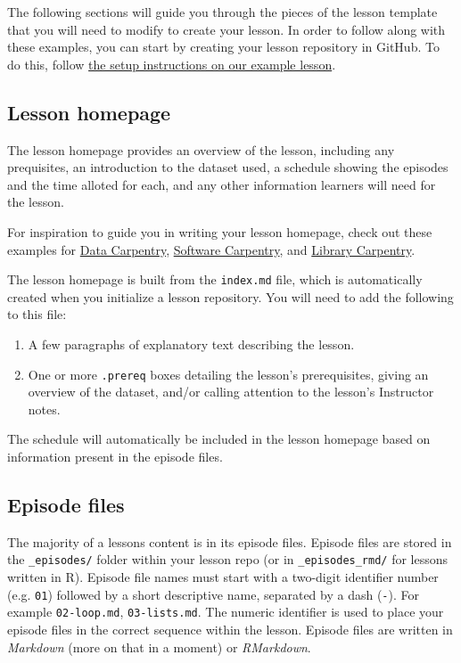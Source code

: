 \documentclass[]{book}
\providecommand{\tightlist}{%
  \setlength{\itemsep}{0pt}\setlength{\parskip}{0pt}}
\begin{document}
The following sections will guide you through the pieces of
the lesson template that you will need to modify to create your lesson.
In order to follow along with these examples, you can start by creating your
lesson repository in GitHub. To do this, follow \href{http://carpentries.github.io/lesson-example/setup.html}{the setup instructions
on our example lesson}.

\hypertarget{lesson-homepage}{%
\subsection{Lesson homepage}\label{lesson-homepage}}

The lesson homepage provides an overview of the lesson, including
any prequisites, an introduction to the
dataset used, a schedule showing
the episodes and the time alloted for each, and any other
information learners will need for the lesson.

For inspiration to guide you in writing your lesson homepage,
check out these examples for \href{https://datacarpentry.org/python-ecology-lesson/}{Data Carpentry}, \href{http://swcarpentry.github.io/git-novice/}{Software Carpentry}, and \href{https://librarycarpentry.org/lc-open-refine/}{Library Carpentry}.

The lesson homepage is built from the \texttt{index.md} file, which is
automatically created when you initialize a lesson repository. You
will need to add the following to this file:

\begin{enumerate}
\def\labelenumi{\arabic{enumi}.}
\tightlist
\item
  A few paragraphs of explanatory text describing the lesson.
\item
  One or more \texttt{.prereq} boxes detailing the lesson's prerequisites, giving an overview of the dataset, and/or calling attention to the lesson's Instructor notes.
\end{enumerate}

The schedule will automatically be included in the lesson homepage based on information present in the
episode files.

\hypertarget{episode-files}{%
\subsection{Episode files}\label{episode-files}}

The majority of a lessons content is in its episode files.
Episode files are stored in the \texttt{\_episodes/} folder within your lesson repo (or in \texttt{\_episodes\_rmd/} for lessons written in R).
Episode file names must start with a two-digit identifier number (e.g. \texttt{01}) followed
by a short descriptive name, separated by a dash (\texttt{-}). For example \texttt{02-loop.md}, \texttt{03-lists.md}.
The numeric identifier is used to place your episode files in the correct sequence within the lesson.
Episode files are written in \emph{Markdown} (more on that in a moment) or \emph{RMarkdown}.
\end{document}
